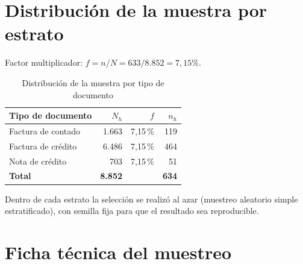 \documentclass[12pt, a4paper]{article}
\theoremstyle{plain}
\theoremstyle{definition}
\theoremstyle{remark}
\begin{document}
\section{Distribución de la muestra por estrato}

Factor multiplicador: $f = n/N = 633/\text{8.852} = 7{,}15\%$.

\begin{table}[htbp]
    \centering
    \caption{Distribución de la muestra por tipo de documento}
    \label{tab:estratos}
    \begin{tabular}{@{}lrrr@{}}
        \toprule
        Tipo de documento & $N_h$ & $f$ & $n_h$ \\
        \midrule
        Factura de contado & 1.663 & 7{,}15\,\% & 119 \\
        Factura de crédito & 6.486 & 7{,}15\,\% & 464 \\
        Nota de crédito     &   703 & 7{,}15\,\% &  51 \\
        \midrule
        \textbf{Total}      & \textbf{8.852} & & \textbf{634} \\
        \bottomrule
    \end{tabular}
\end{table}

Dentro de cada estrato la selección se realizó al azar (muestreo aleatorio
simple estratificado), con semilla fija para que el resultado sea
reproducible.

\section{Ficha técnica del muestreo}
\end{document}
